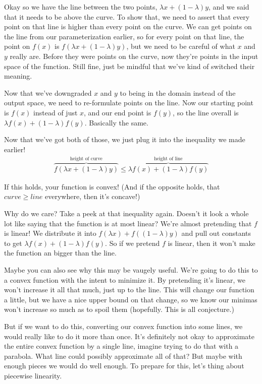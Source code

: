 \documentclass[12pt, letterpaper]{article}
\begin{document}
Okay so we have the line between the two points, $\lambda x + (1 - \lambda) y$, and we said that it needs to be above the curve.
To show that, we need to assert that every point on that line is higher than every point on the curve.
We can get points on the line from our parameterization earlier, so 
for every point on that line, the point on $f(x)$ is $f(\lambda x + (1 - \lambda) y)$, but we need to be careful of what $x$ and $y$
really are. Before they were points on the curve, now they're points in the input space of the function. Still fine, just be mindful
that we've kind of switched their meaning.

Now that we've downgraded $x$ and $y$ to being in the domain instead of the output space, we need to re-formulate points on the line.
Now our starting point is $f(x)$ instead of just $x$, and our end point is $f(y)$,
so the line overall is $\lambda f(x) + (1 - \lambda) f(y)$. Basically the same.

Now that we've got both of those, we just plug it into the inequality we made earlier!
\begin{gather*}
    \overbrace{f(\lambda x + (1 - \lambda) y)}^\text{ height of curve } \leq \overbrace{\lambda f(x) + (1 - \lambda) f(y)}^\text{ height of line }
\end{gather*}

If this holds, your function is convex!
(And if the opposite holds, that $curve \geq line$ everywhere, then it's concave!)

Why do we care? Take a peek at that inequality again.
Doesn't it look a whole lot like saying that the function is at most linear?
We're almost pretending that $f$ is linear! We distribute it into $f(\lambda x) + f((1-\lambda) y)$
and pull out constants to get $\lambda f(x) + (1 - \lambda) f(y)$.
So if we pretend $f$ is linear, then it won't make the function an bigger than the line.

Maybe you can also see why this may be vaugely useful.
We're going to do this to a convex function with the intent to minimize it. 
By pretending it's linear, we won't increase it all that much, just up to the line.
This will change our function a little, but we have a nice upper bound on that change,
so we know our minimas won't increase so much as to spoil them (hopefully. This is all conjecture.)

But if we want to do this, converting our convex function into some lines,
we would really like to do it more than once. It's definitely not okay to approximate
the entire convex function by a single line, imagine trying to do that with a parabola. 
What line could possibly approximate all of that? But maybe with enough pieces we would do 
well enough. To prepare for this, let's thing about piecewise linearity.
\end{document}
